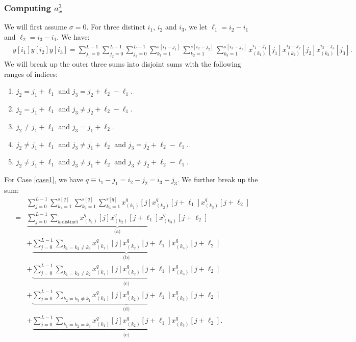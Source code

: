 \documentclass[12pt]{article}
\newcommand{\1}{\mathbf{1}}
\theoremstyle{plain}
\theoremstyle{definition}
\theoremstyle{remark}
\theoremstyle{plain}
\theoremstyle{remark}
\theoremstyle{plain}
\theoremstyle{plain}
\theoremstyle{plain}
\numberwithin{equation}{section}
\begin{document}
%


\subsubsection{Computing $a_x^3$}

We will first assume $\sigma = 0$. For three distinct $i_1$, $i_2$ and $i_3$, we let $\ell_1 = i_2 - i_1$ and $\ell_2 = i_3 - i_1$. We have:
%
\begin{align}
%
& y[i_1] y[i_2] y[i_3]
= \sum_{j_1=0}^{L-1} \sum_{j_2=0}^{L-1} \sum_{j_3=0}^{L-1} 
\sum_{k_1=1}^{s[i_1-j_1]}\sum_{k_2=1}^{s[i_2-j_2]} \sum_{k_3=1}^{s[i_3-j_3]}
x_{(k_1)}^{i_1-j_1}[j_1] x_{(k_2)}^{i_2 - j_2}[j_2] x_{(k_3)}^{i_3 - j_3}[j_3].
\end{align}
%
We will break up the outer three sums into disjoint sums with the following ranges of indices:
%
\begin{enumerate}
	
	\item \label{case1}
	$j_2 = j_1 + \ell_1$ and $j_3 = j_2 + \ell_2 - \ell_1$.
	
	\item \label{case2}
	$j_2 = j_1 + \ell_1$ and $j_3 \ne j_2 + \ell_2 - \ell_1$.
	
	\item \label{case3}
	$j_2 \ne j_1 + \ell_1$ and $j_3 = j_1 + \ell_2$.
	
	\item \label{case4}
	$j_2 \ne j_1 + \ell_1$ and $j_3 \ne j_1 + \ell_2$ and $j_3 = j_2 + \ell_2 - \ell_1$.
	
	\item \label{case5}
	$j_2 \ne j_1 + \ell_1$ and $j_3 \ne j_1 + \ell_2$ and $j_3 \ne j_2 + \ell_2 - \ell_1$.
	
\end{enumerate}


For Case \ref{case1}, we have $q \equiv i_1 - j_1 = i_2 - j_2 = i_3 - j_3$. We further break up the sum:
%
\begin{align}
%
&\sum_{j=0}^{L-1} \sum_{k_1=1}^{s[q]} \sum_{k_2=1}^{s[q]} \sum_{k_3=1}^{s[q]} 
x_{(k_1)}^{q}[j] x_{(k_2)}^{q}[j + \ell_1] x_{(k_3)}^{q}[j + \ell_2]
\nonumber \\
=& \underbrace{ \sum_{j=0}^{L-1} \sum_{k_i \text{distinct}} 
	x_{(k_1)}^{q}[j] x_{(k_2)}^{q}[j + \ell_1] x_{(k_3)}^{q}[j + \ell_2]
}_{\text{(a)}}
\nonumber \\
&+\underbrace{ \sum_{j=0}^{L-1} \sum_{k_1=k_2\ne k_3} 
	x_{(k_1)}^{q}[j] x_{(k_2)}^{q}[j + \ell_1] x_{(k_3)}^{q}[j + \ell_2]
}_{\text{(b)}}
\nonumber \\
&+\underbrace{ \sum_{j=0}^{L-1} \sum_{k_1=k_3\ne k_2} 
	x_{(k_1)}^{q}[j] x_{(k_2)}^{q}[j + \ell_1] x_{(k_3)}^{q}[j + \ell_2]
}_{\text{(c)}}
\nonumber \\
&+\underbrace{ \sum_{j=0}^{L-1} \sum_{k_2=k_3\ne k_1} 
	x_{(k_1)}^{q}[j] x_{(k_2)}^{q}[j + \ell_1] x_{(k_3)}^{q}[j + \ell_2]
}_{\text{(d)}}
\nonumber \\
&+\underbrace{ \sum_{j=0}^{L-1} \sum_{k_1=k_2=k_3} 
	x_{(k_1)}^{q}[j] x_{(k_2)}^{q}[j + \ell_1] x_{(k_3)}^{q}[j + \ell_2]
}_{\text{(e)}}.
%
\end{align}
\end{document}
